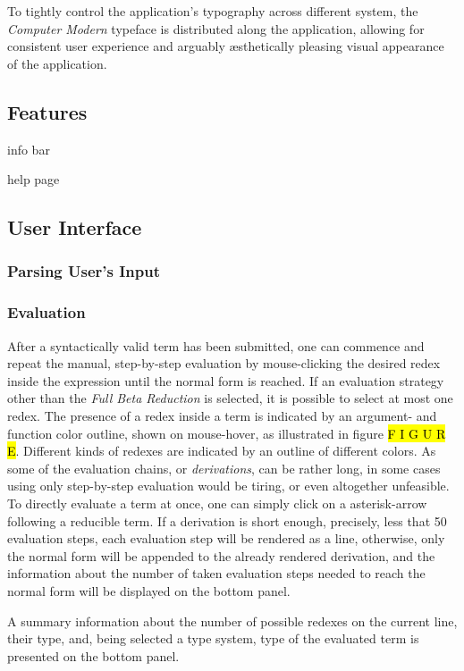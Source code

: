 \documentclass[a4paper,10pt]{article}
\begin{document}
To tightly control the application's typography across different system, 
the \textit{Computer Modern} typeface is distributed along the application, allowing
for consistent user experience and arguably {\ae}sthetically pleasing visual appearance of the application.

\subsection{Features}

info bar

help page

\subsection{User Interface}
\subsubsection{Parsing User's Input}

\subsubsection{Evaluation}
After a syntactically valid term has been submitted, one can commence and repeat
the manual, step-by-step evaluation by
mouse-clicking the desired redex inside the expression until the normal form is reached.
If an evaluation strategy other than the \textit{Full Beta Reduction} is selected, 
it is possible to select at most one redex. The presence of a redex inside a term is
indicated by an argument- and function color outline, shown on mouse-hover, as illustrated
in figure \hl{F I G U R E}. Different kinds of redexes are indicated by an outline of different colors.
As some of the evaluation chains, or \textit{derivations},
can be rather long, in some cases using
only step-by-step evaluation would be tiring, or even altogether unfeasible.
To directly evaluate a term at once, one can simply click on a asterisk-arrow following
a reducible term. If a derivation is short enough, precisely, less that 50 evaluation steps,
each evaluation step will be rendered as a line, otherwise, only the normal form
will be appended to the already rendered derivation, and the information
about the number of taken evaluation steps needed to reach the normal form will be
displayed on the bottom panel.

A summary information about the number of possible redexes
on the current line, their type, and, being selected a type system, type of the evaluated term
is presented on the bottom panel.
\end{document}
